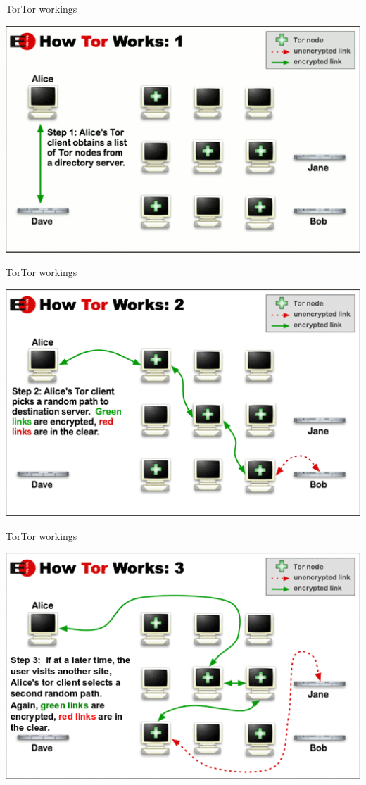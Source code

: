 \begin{frame}{Tor}{Tor workings}
\begin{center}
\includegraphics[scale=0.54]{img/tor1.png}
\end{center}
\end{frame}

\begin{frame}{Tor}{Tor workings}
\begin{center}
\includegraphics[scale=0.54]{img/tor2.png}
\end{center}
\end{frame}

\begin{frame}{Tor}{Tor workings}
\begin{center}
\includegraphics[scale=0.72]{img/tor3.png}
\end{center}
\end{frame}

